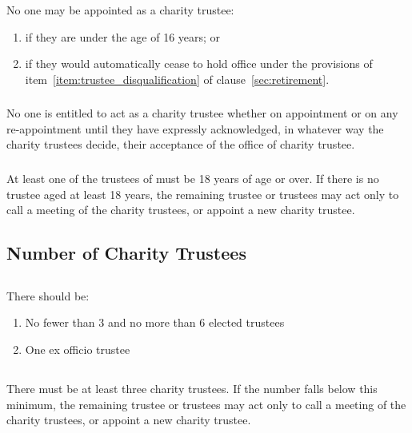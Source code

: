         \subsubsection{}
        No one may be appointed as a charity trustee:
        \begin{enumerate}
            \item if they are under the age of 16 years; or
            \item if they would automatically cease to hold office under the provisions of item~\ref{item:trustee_disqualification} of clause~\ref{sec:retirement}.
        \end{enumerate}

        \subsubsection{}
        No one is entitled to act as a charity trustee whether on appointment or on any re-appointment until they have expressly acknowledged, in whatever way the charity trustees decide, their acceptance of the office of charity trustee.

        \subsubsection{}
        At least one of the trustees of \shortname{} must be 18 years of age or over. If there is no trustee aged at least 18 years, the remaining trustee or trustees may act only to call a meeting of the charity trustees, or appoint a new charity trustee.

    \subsection{Number of Charity Trustees}\label{sec:trustee_numbers}

        \subsection{}\label{sec:min_max}
        There should be:
        \begin{enumerate}
            \item No fewer than 3 and no more than 6 elected trustees
            \item One ex officio trustee
        \end{enumerate}

        \subsection{}
        There must be at least three charity trustees. If the number falls below this minimum, the remaining trustee or trustees may act only to call a meeting of the charity trustees, or appoint a new charity trustee.

